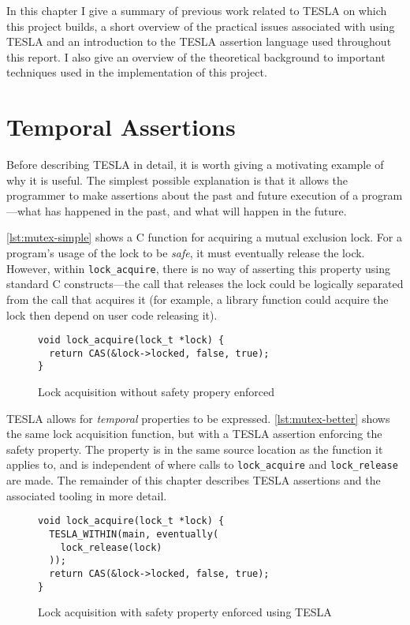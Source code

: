 In this chapter I give a summary of previous work related to TESLA on which this
project builds, a short overview of the practical issues associated with using
TESLA and an introduction to the TESLA assertion language used throughout this
report. I also give an overview of the theoretical background to important
techniques used in the implementation of this project.

\section{Temporal Assertions}

Before describing TESLA in detail, it is worth giving a motivating example of
why it is useful. The simplest possible explanation is that it allows the
programmer to make assertions about the past and future execution of a
program---what has happened in the past, and what will happen in the future.

\autoref{lst:mutex-simple} shows a C function for acquiring a mutual exclusion
lock. For a program's usage of the lock to be \emph{safe}, it must eventually
release the lock. However, within \texttt{lock_acquire}, there is no way
of asserting this property using standard C constructs---the call that releases
the lock could be logically separated from the call that acquires it (for
example, a library function could acquire the lock then depend on user code
releasing it).

\begin{figure}
  \begin{verbatim}
void lock_acquire(lock_t *lock) {
  return CAS(&lock->locked, false, true);
}
  \end{verbatim}
  \caption{Lock acquisition without safety propery enforced}
  \label{lst:mutex-simple}
\end{figure}

TESLA allows for \emph{temporal} properties to be expressed.
\autoref{lst:mutex-better} shows the same lock acquisition function, but with a
TESLA assertion enforcing the safety property. The property is in the same
source location as the function it applies to, and is independent of where calls
to \texttt{lock_acquire} and \texttt{lock_release} are made. The
remainder of this chapter describes TESLA assertions and the associated tooling
in more detail.

\begin{figure}
  \begin{verbatim}
void lock_acquire(lock_t *lock) {
  TESLA_WITHIN(main, eventually(
    lock_release(lock)
  ));
  return CAS(&lock->locked, false, true);
}
  \end{verbatim}
  \caption{Lock acquisition with safety property enforced using TESLA}
  \label{lst:mutex-better}
\end{figure}

